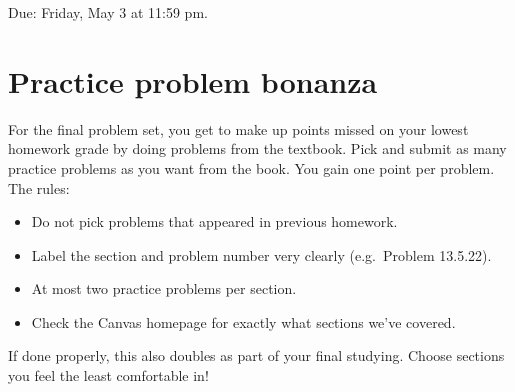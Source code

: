 \maketitle

Due: Friday, May 3 at 11:59 pm.

\section{Practice problem bonanza}
For the final problem set, you get to make up points missed on your lowest homework grade by doing problems from the textbook. Pick and submit as many practice problems as you want from the book. You gain one point per problem. The rules:
\begin{itemize}
  \item Do not pick problems that appeared in previous homework.
  \item Label the section and problem number very clearly (e.g.\ Problem 13.5.22).
  \item At most two practice problems per section.
  \item Check the Canvas homepage for exactly what sections we've covered.
\end{itemize}
If done properly, this also doubles as part of your final studying. Choose sections you feel the least comfortable in!
